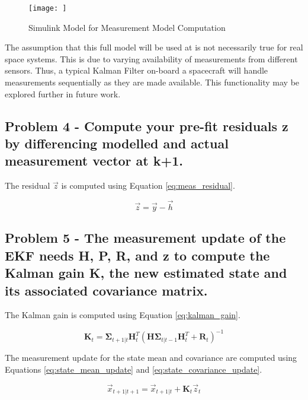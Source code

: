 \begin{figure}[H]
    \centering
    \captionsetup{ justification = centering }
    \texttt{[image: ]}
    \caption{Simulink Model for Measurement Model Computation}
    \label{fig:simulink_meas_model}
\end{figure}

The assumption that this full model will be used at is not necessarily true for real space systems. This is due to varying availability of measurements from different sensors. Thus, a typical Kalman Filter on-board a spacecraft will handle measurements sequentially as they are made available. This functionality may be explored further in future work.

\subsection{Problem 4 - Compute your pre-fit residuals z by differencing modelled and actual measurement vector at k+1.}

The residual $\vec{z}$ is computed using Equation \ref{eq:meas_residual}.

\begin{equation} \label{eq:meas_residual}
    \vec{z} = \vec{y} - \vec{h}
\end{equation}

\subsection{Problem 5 - The measurement update of the EKF needs H, P, R, and z to compute the Kalman gain K, the new estimated state and its associated covariance matrix.}

The Kalman gain is computed using Equation \ref{eq:kalman_gain}.

\begin{equation} \label{eq:kalman_gain}
    \boldsymbol{K}_t = \boldsymbol{\Sigma}_{t+1 \vert t} \boldsymbol{H}_t^T \left( \boldsymbol{H} \boldsymbol{\Sigma}_{t \vert t-1} \boldsymbol{H}_t^T + \boldsymbol{R}_t \right)^{-1}
\end{equation}

The measurement update for the state mean and covariance are computed using Equations \ref{eq:state_mean_update} and \ref{eq:state_covariance_update}.

\begin{equation} \label{eq:state_mean_update}
    \vec{x}_{t+1 \vert t+1} = \vec{x}_{t+1 \vert t} + \boldsymbol{K}_t \vec{z}_t
\end{equation}

